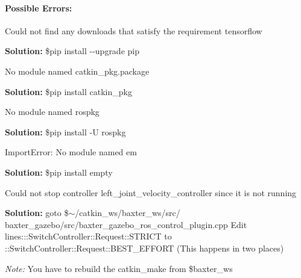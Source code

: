 \paragraph*{Possible Errors\+:}


\begin{DoxyEnumerate}
\item Could not find any downloads that satisfy the requirement tensorflow

{\bfseries Solution\+:} {\ttfamily \$pip install -\/-\/upgrade pip}
\item No module named catkin\+\_\+pkg.\+package

{\bfseries Solution\+:} {\ttfamily \$pip install catkin\+\_\+pkg}
\item No module named rospkg

{\bfseries Solution\+:} {\ttfamily \$pip install -\/U rospkg}
\item Import\+Error\+: No module named \textquotesingle{}em\textquotesingle{}

{\bfseries Solution\+:} {\ttfamily \$pip install empty}
\item Could not stop controller \textquotesingle{}left\+\_\+joint\+\_\+velocity\+\_\+controller\textquotesingle{} since it is not running

{\bfseries Solution\+:} goto {\ttfamily \$$\sim$/catkin\+\_\+ws/baxter\+\_\+ws/src/ baxter\+\_\+gazebo/src/baxter\+\_\+gazebo\+\_\+ros\+\_\+control\+\_\+plugin.\+cpp} Edit lines\+:{\ttfamily \+::\+Switch\+Controller\+::\+Request\+::\+S\+T\+R\+I\+CT to \+::\+Switch\+Controller\+::\+Request\+::\+B\+E\+S\+T\+\_\+\+E\+F\+F\+O\+RT (This happens in two places)}
\end{DoxyEnumerate}

{\itshape Note\+:} You have to rebuild the catkin\+\_\+make from \$baxter\+\_\+ws 